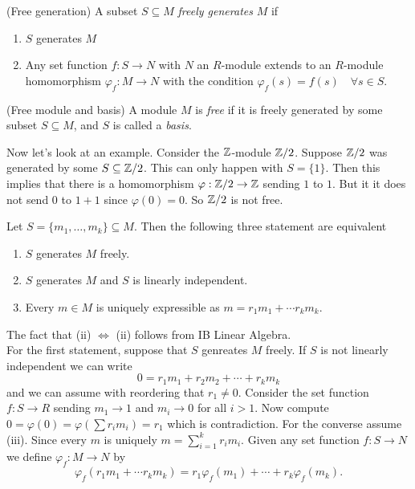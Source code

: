 \documentclass{article}
\begin{document}
\begin{itemize}
\begin{definition}
	(Free generation) A subset $ S\subseteq M $ \textit{freely generates} $ M $ if 
	\begin{enumerate}
		\item $ S $ generates $ M $
		\item Any set function $ f:S\to N $ with $ N $ an $ R $-module extends to an $ R $-module homomorphism $ \varphi_f:M\to N $ with the condition $ \varphi_f(s)=f(s)\quad\forall s\in S $.
	\end{enumerate}
\end{definition}
\begin{definition}
	(Free module and basis) A module $ M $ is \textit{free} if it is freely generated by some subset $ S\subseteq M $, and $ S $ is called a \textit{basis}.
\end{definition}
Now let's look at an example. Consider the $ \mathbb{Z} $-module $ \mathbb{Z}/2 $. Suppose $ \mathbb{Z}/2 $ was generated by some $ S\subseteq \mathbb{Z}/2 $. This can only happen with $ S=\{1\} $. Then this implies that there is a homomorphism $ \varphi:\mathbb{Z}/2\to \mathbb{Z} $ sending $ 1 $ to $ 1 $. But it it does not send $ 0 $ to $ 1+1 $ since $ \varphi(0)=0 $. So $ \mathbb{Z}/2 $ is not free.
\begin{proposition}
	Let $ S=\{m_1,\dots,m_k\}\subseteq M $. Then the following three statement are equivalent
	\begin{enumerate}
		\item $ S $ generates $ M $ freely.
		\item $ S $ generates $ M $ and $ S $ is linearly independent.
		\item Every $ m\in M $ is uniquely expressible as $ m=r_1m_1+\cdots r_km_k $.
	\end{enumerate}
\end{proposition}
\pf The fact that (ii) $ \iff $ (ii) follows from IB Linear Algebra.\\
For the first statement, suppose that $ S $ genreates $ M $ freely. If $ S $ is not linearly independent we can write
\[
  0=r_1m_1+r_2m_2+\cdots +r_km_k
\]
and we can assume with reordering that $ r_1\ne 0 $. Consider the set function $ f:S\to R $ sending $ m_1\to 1 $ and $ m_i\to 0 $ for all $ i>1 $. Now compute $ 0=\varphi(0)=\varphi\left(\sum r_im_i\right)=r_1 $ which is contradiction.
For the converse assume (iii). Since every $ m $ is uniquely $ m=\sum^k_{i=1}r_im_i $. Given any set function $ f:S\to N $ we define $ \varphi_f:M\to N $ by
\[
  \varphi_f(r_1m_1+\cdots r_km_k)=r_1\varphi_f(m_1)+\cdots+r_k\varphi_f(m_k).
\]
\end{itemize}
\end{document}
